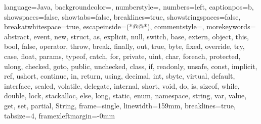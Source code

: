 \usepackage{listings}
\usepackage{listing}
\usepackage{xcolor}
\usepackage{minted}


\renewcommand\theFancyVerbLine{\normalsize\arabic{FancyVerbLine}}




 {
language=Java,
backgroundcolor=\color{backgroundcolour},
numberstyle=\color{gray},
numbers=left, 
captionpos=b,
showspaces=false,
showtabs=false,
breaklines=true,
showstringspaces=false,
breakatwhitespace=true,
escapeinside={(*@}{@*)},
commentstyle=\color{greencomments},
morekeywords={  abstract, event, new, struct,
                as, explicit, null, switch,
                base, extern, object, this,
                bool, false, operator, throw,
                break, finally, out, true,
                byte, fixed, override, try,
                case, float, params, typeof,
                catch, for, private, uint,
                char, foreach, protected, ulong,
                checked, goto, public, unchecked,
                class, if, readonly, unsafe,
                const, implicit, ref, ushort,
                continue, in, return, using,
                decimal, int, sbyte, virtual,
                default, interface, sealed, volatile,
                delegate, internal, short, void,
                do, is, sizeof, while,
                double, lock, stackalloc,
                else, long, static,
                enum, namespace, string, var, 
                value, get, set, partial, String},
frame=single,
linewidth=159mm,
breaklines=true,
tabsize=4,
framexleftmargin=-0mm
}


